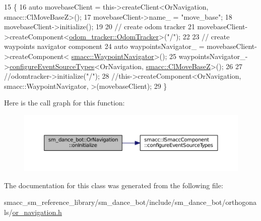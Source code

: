 \begin{DoxyCode}
15     \{
16         \textcolor{keyword}{auto} movebaseClient = this->createClient<OrNavigation, smacc::ClMoveBaseZ>();
17         movebaseClient->name\_ = \textcolor{stringliteral}{"move\_base"};
18         movebaseClient->initialize();
19 
20         \textcolor{comment}{// create odom tracker}
21         movebaseClient->createComponent<\hyperlink{classodom__tracker_1_1OdomTracker}{odom\_tracker::OdomTracker}>(\textcolor{stringliteral}{"/"});
22         
23         \textcolor{comment}{// create waypoints navigator component}
24         \textcolor{keyword}{auto} waypointsNavigator\_ = movebaseClient->createComponent<
      \hyperlink{classsmacc_1_1WaypointNavigator}{smacc::WaypointNavigator}>();
25         waypointsNavigator\_->\hyperlink{classsmacc_1_1ISmaccComponent_ad1c9ede43be1f83c10c6e7a2e14db8d3}{configureEventSourceTypes}<OrNavigation, 
      \hyperlink{classsmacc_1_1ClMoveBaseZ}{smacc::ClMoveBaseZ}>();
26 
27         \textcolor{comment}{//odomtracker->initialize("/");}
28         \textcolor{comment}{//this->createComponent<OrNavigation, smacc::WaypointNavigator, >(movebaseClient);}
29     \}
\end{DoxyCode}


Here is the call graph for this function\+:
\nopagebreak
\begin{figure}[H]
\begin{center}
\leavevmode
\includegraphics[width=350pt]{classsm__dance__bot_1_1OrNavigation_a9f87c78f5af67024c9eda25097a135ac_cgraph}
\end{center}
\end{figure}




The documentation for this class was generated from the following file\+:\begin{DoxyCompactItemize}
\item 
smacc\+\_\+sm\+\_\+reference\+\_\+library/sm\+\_\+dance\+\_\+bot/include/sm\+\_\+dance\+\_\+bot/orthogonals/\hyperlink{sm__dance__bot_2include_2sm__dance__bot_2orthogonals_2or__navigation_8h}{or\+\_\+navigation.\+h}\end{DoxyCompactItemize}
